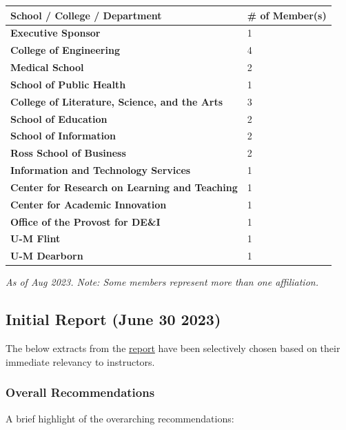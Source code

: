 \documentclass[
]{book}
\begin{document}
\begin{longtable}[]{@{}ll@{}}
\toprule\noalign{}
School / College / Department & \# of Member(s) \\
\midrule\noalign{}
\endhead
\bottomrule\noalign{}
\endlastfoot
\textbf{Executive Sponsor} & 1 \\
\textbf{College of Engineering} & 4 \\
\textbf{Medical School} & 2 \\
\textbf{School of Public Health} & 1 \\
\textbf{College of Literature, Science, and the Arts} & 3 \\
\textbf{School of Education} & 2 \\
\textbf{School of Information} & 2 \\
\textbf{Ross School of Business} & 2 \\
\textbf{Information and Technology Services} & 1 \\
\textbf{Center for Research on Learning and Teaching} & 1 \\
\textbf{Center for Academic Innovation} & 1 \\
\textbf{Office of the Provost for DE\&I} & 1 \\
\textbf{U-M Flint} & 1 \\
\textbf{U-M Dearborn} & 1 \\
\end{longtable}

\emph{As of Aug 2023. Note: Some members represent more than one affiliation.}

\hypertarget{initial-report-june-30-2023}{%
\subsection{Initial Report (June 30 2023)}\label{initial-report-june-30-2023}}

The below extracts from the \href{https://genai.umich.edu/committee-report}{report} have been selectively chosen based on their immediate relevancy to instructors.

\hypertarget{overall-recommendations}{%
\subsubsection*{Overall Recommendations}\label{overall-recommendations}}

A brief highlight of the overarching recommendations:
\end{document}
